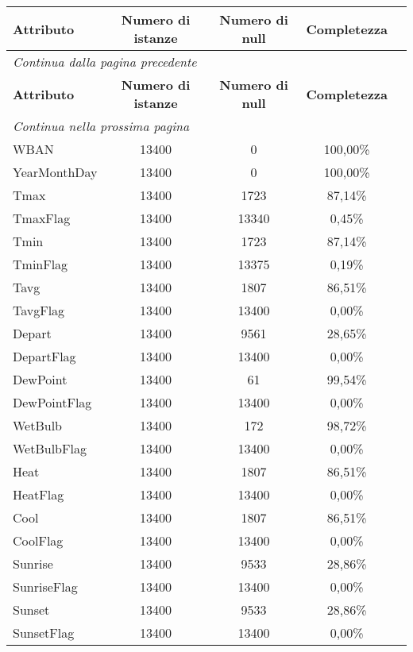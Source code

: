 	\begin{longtable}{lcccc}
		\toprule
		\textbf{Attributo} \quad & \textbf{Numero di istanze} & \textbf{Numero di null} & \textbf{Completezza} \\
		\midrule
		\endfirsthead
		\multicolumn{5}{l}{\footnotesize\itshape Continua dalla pagina precedente} \\
		\toprule
		\textbf{Attributo} \quad & \textbf{Numero di istanze} & \textbf{Numero di null} & \textbf{Completezza} \\
		\midrule			
		\endhead
		\multicolumn{5}{l}{\footnotesize\itshape Continua nella prossima pagina} \\
		\endfoot
		WBAN			& 13400 & 0	 		 & 100,00\%  	\\	
		YearMonthDay	& 13400 & 0	 		 & 100,00\%  	\\	
		Tmax			& 13400 & 1723	     & 87,14\%  	\\
		TmaxFlag		& 13400 & 13340	     & 0,45\%  		\\	
		Tmin			& 13400 & 1723	     & 87,14\%  	\\
		TminFlag		& 13400 & 13375	     & 0,19\%  		\\	
		Tavg			& 13400 & 1807	     & 86,51\%  	\\
		TavgFlag		& 13400 & 13400	     & 0,00\%  		\\	
		Depart			& 13400 & 9561	     & 28,65\%  	\\
		DepartFlag		& 13400 & 13400	     & 0,00\%  		\\	
		DewPoint		& 13400 & 61	   	 & 99,54\%  	\\
		DewPointFlag	& 13400 & 13400	     & 0,00\%  		\\		
		WetBulb			& 13400 & 172	     & 98,72\%  	\\
		WetBulbFlag		& 13400 & 13400	     & 0,00\%  		\\	
		Heat			& 13400 & 1807	     & 86,51\%  	\\
		HeatFlag		& 13400 & 13400	     & 0,00\%  		\\	
		Cool			& 13400 & 1807	     & 86,51\%  	\\
		CoolFlag		& 13400 & 13400	     & 0,00\%  		\\	
		Sunrise			& 13400 & 9533	     & 28,86\%  	\\
		SunriseFlag		& 13400 & 13400	     & 0,00\%  		\\	
		Sunset			& 13400 & 9533	     & 28,86\%  	\\
		SunsetFlag		& 13400 & 13400	     & 0,00\%  		\\	

\end{longtable}
